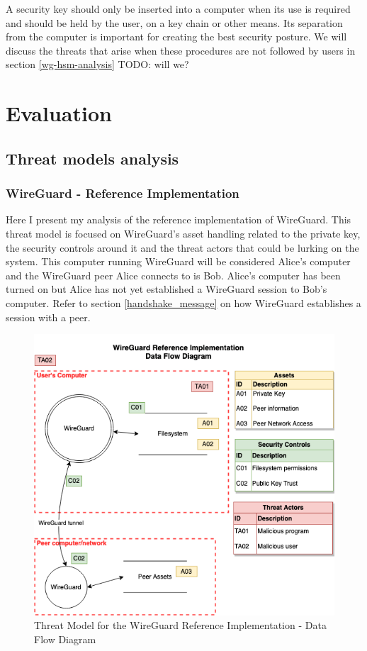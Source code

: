 \documentclass [11pt, proquest] {uwthesis}[2020/02/24]
\begin{document}
A security key should only be inserted into a computer when its use is required and should be held by the user, on a key chain or other means. Its separation from the computer is important for creating the best security posture. We will discuss the threats that arise when these procedures are not followed by users in section \ref{wg-hsm-analysis} TODO: will we?

\chapter {Evaluation}
\section{Threat models analysis}

\subsection {WireGuard - Reference Implementation}
\label{wg-ref-analysis}


Here I present my analysis of the reference implementation of WireGuard. This threat model is focused on WireGuard's asset handling related to the private key, the security controls around it and the threat actors that could be lurking on the system. This computer running WireGuard will be considered Alice's computer and the WireGuard peer Alice connects to is Bob. Alice's computer has been turned on but Alice has not yet established a WireGuard session to Bob's computer. Refer to section \ref{handshake_message} on how WireGuard establishes a session with a peer. 

\begin{figure}[ht]
\includegraphics[width=14cm]{paper/images/WGH_DFD.drawio.png}
\caption{Threat Model for the WireGuard Reference Implementation - Data Flow Diagram}
\label{fig:wg_ref_dfd}
\end{figure}
\end{document}
